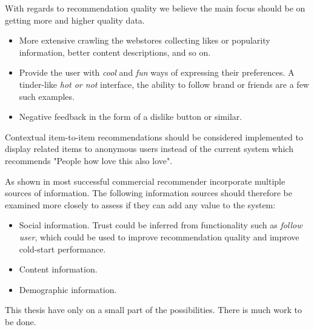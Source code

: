 With regards to recommendation quality we believe the main focus should be on getting more
and higher quality data.

\begin{itemize}
\item More extensive crawling the webstores collecting likes or popularity information, better content descriptions,
	  and so on.	 
\item Provide the user with \emph{cool} and \emph{fun} ways of expressing their preferences. A tinder-like \emph{hot or not}
	  interface, the ability to follow brand or friends are a few such examples.
\item Negative feedback in the form of a dislike button or similar.
\end{itemize}


Contextual item-to-item recommendations should be considered implemented to display related
items to anonymous users instead of the current system which recommends "People how love this also love".


	
	

As shown in \cite{FranceTelecom} most successful commercial recommender incorporate multiple
sources of information. The following information sources should therefore be examined more
closely to assess if they can add any value to the system:

\begin{itemize}
\item Social information. Trust could be inferred from functionality such as \emph{follow user}, which
	  could be used to improve recommendation quality and improve cold-start performance.
\item Content information. 
\item Demographic information.
\end{itemize}




This thesis have only on a small part of the possibilities. There is much work to be done. %
	
